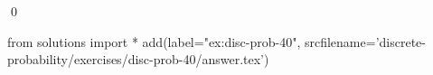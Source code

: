 
\begin{ex} 
  \label{ex:disc-prob-40}
  
  \qed
\end{ex} 
\begin{python0}
from solutions import *
add(label="ex:disc-prob-40",
    srcfilename='discrete-probability/exercises/disc-prob-40/answer.tex') 
\end{python0}
